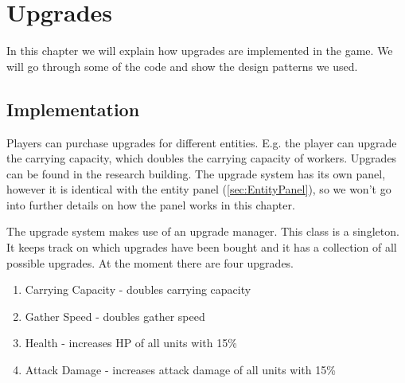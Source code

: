 \section{Upgrades}
In this chapter we will explain how upgrades are implemented in the game. We will go through some of the code and show the design patterns we used.

\subsection{Implementation} \label{Upgrades}
Players can purchase upgrades for different entities. E.g. the player can upgrade the carrying capacity, which doubles the carrying capacity of workers. Upgrades can be found in the research building. The upgrade system has its own panel, however it is identical with the entity panel (\cref{sec:EntityPanel}), so we won't go into further details on how the panel works in this chapter. 

The upgrade system makes use of an upgrade manager. This class is a singleton. It keeps track on which upgrades have been bought and it has a collection of all possible upgrades. At the moment there are four upgrades.

\begin{enumerate}
\item Carrying Capacity - doubles carrying capacity
\item Gather Speed - doubles gather speed
\item Health - increases HP of all units with 15\%
\item Attack Damage - increases attack damage of all units with 15\%
\end{enumerate}

